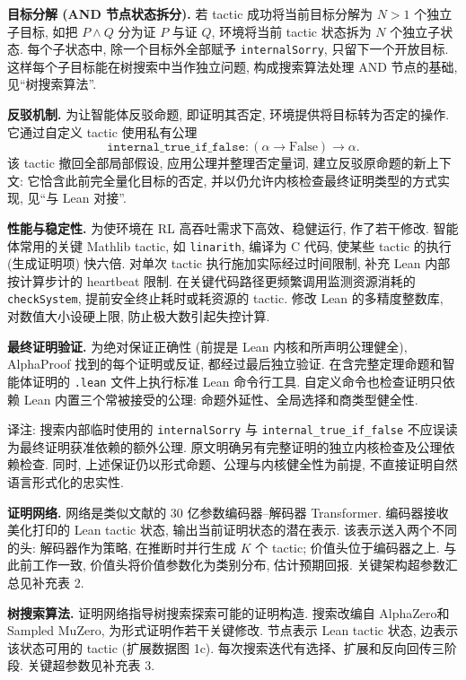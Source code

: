 \noindent\textbf{目标分解 (AND 节点状态拆分).} 若 tactic 成功将当前目标分解为 $N>1$ 个独立子目标, 如把 $P\land Q$ 分为证 $P$ 与证 $Q$, 环境将当前 tactic 状态拆为 $N$ 个独立子状态. 每个子状态中, 除一个目标外全部赋予 \texttt{internalSorry}, 只留下一个开放目标. 这样每个子目标能在树搜索中当作独立问题, 构成搜索算法处理 AND 节点的基础, 见“树搜索算法”.

\noindent\textbf{反驳机制.} 为让智能体反驳命题, 即证明其否定, 环境提供将目标转为否定的操作. 它通过自定义 tactic 使用私有公理
\[
\texttt{internal\_true\_if\_false}: (\alpha\to\mathrm{False})\to\alpha.
\]
该 tactic 撤回全部局部假设, 应用公理并整理否定量词, 建立反驳原命题的新上下文: 它恰含此前完全量化目标的否定, 并以仍允许内核检查最终证明类型的方式实现, 见“与 Lean 对接”.

\noindent\textbf{性能与稳定性.} 为使环境在 RL 高吞吐需求下高效、稳健运行, 作了若干修改. 智能体常用的关键 Mathlib tactic, 如 \texttt{linarith}, 编译为 C 代码, 使某些 tactic 的执行 (生成证明项) 快六倍. 对单次 tactic 执行施加实际经过时间限制, 补充 Lean 内部按计算步计的 heartbeat 限制. 在关键代码路径更频繁调用监测资源消耗的 \texttt{checkSystem}, 提前安全终止耗时或耗资源的 tactic. 修改 Lean 的多精度整数库, 对数值大小设硬上限, 防止极大数引起失控计算.

\noindent\textbf{最终证明验证.} 为绝对保证正确性 (前提是 Lean 内核和所声明公理健全), AlphaProof 找到的每个证明或反证, 都经过最后独立验证. 在含完整定理命题和智能体证明的 \texttt{.lean} 文件上执行标准 Lean 命令行工具. 自定义命令也检查证明只依赖 Lean 内置三个常被接受的公理: 命题外延性、全局选择和商类型健全性.

\begin{remark}
译注: 搜索内部临时使用的 \texttt{internalSorry} 与 \texttt{internal\_true\_if\_false} 不应误读为最终证明获准依赖的额外公理. 原文明确另有完整证明的独立内核检查及公理依赖检查. 同时, 上述保证仍以形式命题、公理与内核健全性为前提, 不直接证明自然语言形式化的忠实性.
\end{remark}

\label{alphaproof-methods-agent}
\noindent\textbf{证明网络.} 网络是类似文献\cite{alphaproof-ref16}的 30 亿参数编码器--解码器 Transformer\cite{alphaproof-ref15}. 编码器接收美化打印的 Lean tactic 状态, 输出当前证明状态的潜在表示. 该表示送入两个不同的头: 解码器作为策略, 在推断时并行生成 $K$ 个 tactic; 价值头位于编码器之上. 与此前工作\cite{alphaproof-ref72}一致, 价值头将价值参数化为类别分布, 估计预期回报. 关键架构超参数汇总见补充表 2.

\noindent\textbf{树搜索算法.} 证明网络指导树搜索探索可能的证明构造. 搜索改编自 AlphaZero\cite{alphaproof-ref2}和 Sampled MuZero\cite{alphaproof-ref18}, 为形式证明作若干关键修改. 节点表示 Lean tactic 状态, 边表示该状态可用的 tactic (扩展数据图 1c). 每次搜索迭代有选择、扩展和反向回传三阶段. 关键超参数见补充表 3.

